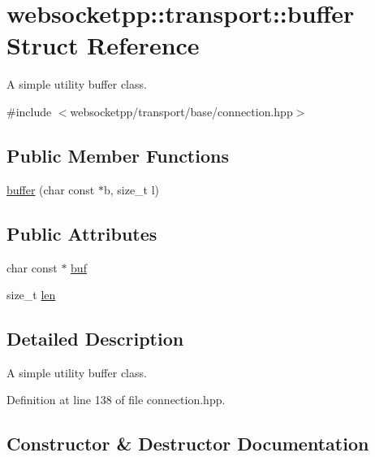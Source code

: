 \hypertarget{structwebsocketpp_1_1transport_1_1buffer}{}\section{websocketpp\+:\+:transport\+:\+:buffer Struct Reference}
\label{structwebsocketpp_1_1transport_1_1buffer}


A simple utility buffer class.  




{\ttfamily \#include $<$websocketpp/transport/base/connection.\+hpp$>$}

\subsection*{Public Member Functions}
\begin{DoxyCompactItemize}
\item 
\hyperlink{structwebsocketpp_1_1transport_1_1buffer_a763623c638a41e3bb479b9b02c8437f2}{buffer} (char const $\ast$b, size\+\_\+t l)
\end{DoxyCompactItemize}
\subsection*{Public Attributes}
\begin{DoxyCompactItemize}
\item 
char const $\ast$ \hyperlink{structwebsocketpp_1_1transport_1_1buffer_a20572b592e33bf04ce5ffd7bced03c59}{buf}
\item 
size\+\_\+t \hyperlink{structwebsocketpp_1_1transport_1_1buffer_a89627b29fb3670a3a611ea2737d39821}{len}
\end{DoxyCompactItemize}


\subsection{Detailed Description}
A simple utility buffer class. 

Definition at line 138 of file connection.\+hpp.



\subsection{Constructor \& Destructor Documentation}
\hypertarget{structwebsocketpp_1_1transport_1_1buffer_a763623c638a41e3bb479b9b02c8437f2}{}
